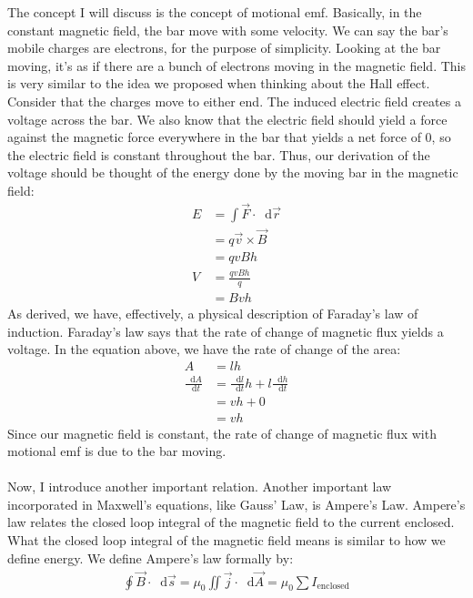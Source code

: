 \documentclass{article}
\newcommand*\dif{\mathop{}\!\mathrm{d}}
\begin{document}
The concept I will discuss is the concept of motional emf. Basically, in the constant magnetic field, the bar move with some velocity. We can say the bar's mobile charges are electrons, for the purpose of simplicity. Looking at the bar moving, it's as if there are a bunch of electrons moving in the magnetic field. This is very similar to the idea we proposed when thinking about the Hall effect. Consider that the charges move to either end. The induced electric field creates a voltage across the bar. We also know that the electric field should yield a force against the magnetic force everywhere in the bar that yields a net force of $0$, so the electric field is constant throughout the bar. Thus, our derivation of the voltage should be thought of the energy done by the moving bar in the magnetic field:
\begin{align*}
E &= \int \vec{F} \cdot \dif \vec{r}\\
&= q\vec{v}\times\vec{B}\\
&= qvBh\\
V &= \frac{qvBh}{q}\\
&= Bvh
\end{align*}
As derived, we have, effectively, a physical description of Faraday's law of induction. Faraday's law says that the rate of change of magnetic flux yields a voltage. In the equation above, we have the rate of change of the area:
\begin{align*}
A &= lh\\
\frac{\dif A}{\dif t} &= \frac{\dif l}{\dif t} h + l \frac{\dif h}{\dif t}\\
&= vh + 0\\
&= vh 
\end{align*}
Since our magnetic field is constant, the rate of change of magnetic flux with motional emf is due to the bar moving.\\
\\
Now, I introduce another important relation. Another important law incorporated in Maxwell's equations, like Gauss' Law, is Ampere's Law. Ampere's law relates the closed loop integral of the magnetic field to the current enclosed. What the closed loop integral of the magnetic field means is similar to how we define energy. We define Ampere's law formally by:
\begin{align*}
\oint \vec{B} \cdot \dif \vec{s} = \mu_0 \iint \vec{j} \cdot \dif \vec{A} = \mu_0 \sum\limits I_{\text{enclosed}}
\end{align*} 
\end{document}
